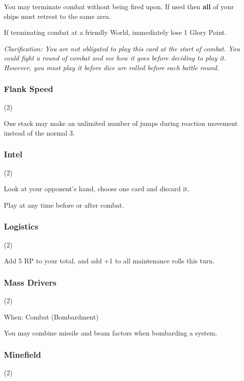 
You may terminate combat without being fired upon. If used then \textbf{all} of your ships must retreat to the same area.

If terminating combat at a friendly World, immediately lose 1 Glory Point.

\textit{Clarification: You are not obligated to play this card at the start of combat. You could fight a round of combat and see how it goes before deciding to play it. However, you must play it before dice are rolled before each battle round.}

\subsubsection{Flank Speed} (2)


One stack may make an unlimited number of jumps during reaction movement instead of the normal 3.

\subsubsection{Intel} (2)


Look at your opponent's hand, choose one card and discard it.

Play at any time before or after combat.

\subsubsection{Logistics} (2)


Add 5 RP to your total, and add +1 to all maintenance rolls this turn.

\subsubsection{Mass Drivers} (2)

When:  Combat (Bombardment)

You may combine missile and beam factors when bombarding a system.

\subsubsection{Minefield} (2)

